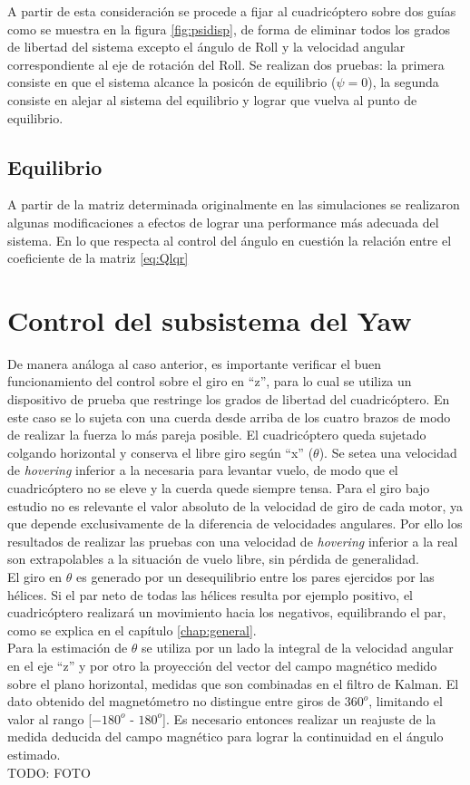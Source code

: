 \documentclass[main]{subfiles}
\begin{document}
A partir de esta consideraci\'on se procede a fijar al cuadric\'optero sobre dos gu\'ias como se muestra en la figura \ref{fig:psidisp}, de forma de eliminar todos los grados de libertad del sistema excepto el \'angulo de Roll y la velocidad angular correspondiente al eje de rotaci\'on del Roll. Se realizan dos pruebas: la primera consiste en que el sistema alcance la posic\'on de equilibrio ($\psi = 0$), la segunda consiste en alejar al sistema del equilibrio y lograr que vuelva al punto de equilibrio. 

\subsection{Equilibrio}
A partir de la matriz determinada originalmente en las simulaciones se realizaron algunas modificaciones a efectos de lograr una performance m\'as adecuada del sistema. En lo que respecta al control del \'angulo en cuesti\'on la relaci\'on entre el coeficiente de la matriz \ref{eq:Qlqr}

\section{Control del subsistema del Yaw}


De manera análoga al caso anterior, es importante verificar el buen funcionamiento del control sobre el giro en ``z'', para lo cual se utiliza un dispositivo de prueba que restringe los grados de libertad del cuadricóptero. En este caso se lo sujeta con una cuerda desde arriba de los cuatro brazos de modo de realizar la fuerza lo más pareja posible. El cuadricóptero queda sujetado colgando horizontal y conserva el libre giro según ``x'' ($\theta$).
Se setea una velocidad de \emph{hovering} inferior a la necesaria para levantar vuelo, de modo que el cuadricóptero no se eleve y la cuerda quede siempre tensa. Para el giro bajo estudio no es relevante el valor absoluto de la velocidad de giro de cada motor, ya que depende exclusivamente de la diferencia de velocidades angulares. Por ello los resultados de realizar las pruebas con una velocidad de \emph{hovering} inferior a la real son extrapolables a la situación de vuelo libre, sin pérdida de generalidad.\\

El giro en $\theta$ es generado por un desequilibrio entre los pares ejercidos por las hélices. Si el par neto de todas las hélices resulta por ejemplo positivo, el cuadricóptero realizará un movimiento hacia los negativos, equilibrando el par, como se explica en el capítulo \ref{chap:general}.\\

Para la estimación de $\theta$ se utiliza por un lado la integral de la velocidad angular en el eje ``z'' y por otro la proyección del vector del campo magnético medido sobre el plano horizontal, medidas que son combinadas en el filtro de Kalman. El dato obtenido del magnetómetro no distingue entre giros de $360^o$, limitando el valor al rango [$-180^o$ - $180^o$]. Es necesario entonces realizar un reajuste de la medida deducida del campo magnético para lograr la continuidad en el ángulo estimado.\\

TODO: FOTO
\end{document}
